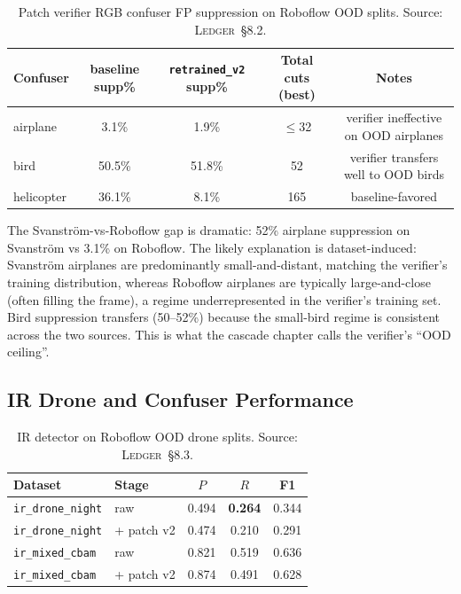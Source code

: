\documentclass[12pt,a4paper,oneside,openright]{book}
\begin{document}
\begin{table}[htbp]
    \centering
    \caption{Patch verifier RGB confuser FP suppression on Roboflow OOD splits. Source: \textsc{Ledger}~\S8.2.}
    \label{tab:ood_rgb_confuser}
    \begin{tabular}{lcccc}
        \toprule
        Confuser & baseline supp\% & \texttt{retrained\_v2} supp\% & Total cuts (best) & Notes \\
        \midrule
        airplane   &  3.1\% &  1.9\% &  $\leq$32 & verifier ineffective on OOD airplanes \\
        bird       & 50.5\% & 51.8\% & 52 & verifier transfers well to OOD birds \\
        helicopter & 36.1\% &  8.1\% & 165 & baseline-favored \\
        \bottomrule
    \end{tabular}
\end{table}

The Svanstr\"om-vs-Roboflow gap is dramatic: 52\% airplane suppression on Svanstr\"om vs 3.1\% on Roboflow. The likely explanation is dataset-induced: Svanstr\"om airplanes are predominantly small-and-distant, matching the verifier's training distribution, whereas Roboflow airplanes are typically large-and-close (often filling the frame), a regime underrepresented in the verifier's training set. Bird suppression transfers (50--52\%) because the small-bird regime is consistent across the two sources. This is what the cascade chapter calls the verifier's ``OOD ceiling''.

\subsection{IR Drone and Confuser Performance}

\begin{table}[htbp]
    \centering
    \caption{IR detector on Roboflow OOD drone splits. Source: \textsc{Ledger}~\S8.3.}
    \label{tab:ood_ir}
    \begin{tabular}{llccc}
        \toprule
        Dataset & Stage & $P$ & $R$ & F1 \\
        \midrule
        \texttt{ir\_drone\_night} & raw & 0.494 & \textbf{0.264} & 0.344 \\
        \texttt{ir\_drone\_night} & + patch v2 & 0.474 & 0.210 & 0.291 \\
        \texttt{ir\_mixed\_cbam}  & raw & 0.821 & 0.519 & 0.636 \\
        \texttt{ir\_mixed\_cbam}  & + patch v2 & 0.874 & 0.491 & 0.628 \\
        \bottomrule
    \end{tabular}
\end{table}
\end{document}
